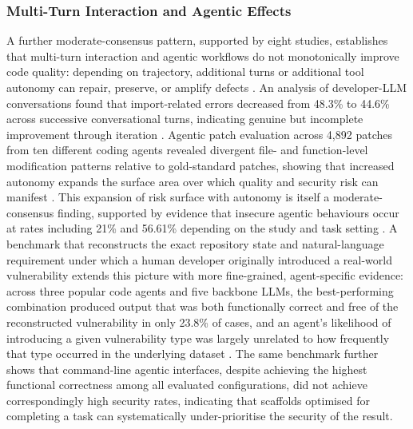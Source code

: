 \subsubsection{Multi-Turn Interaction and Agentic Effects}
\label{sec:cqtd-multiturn}
A further moderate-consensus pattern, supported by eight studies, establishes that multi-turn interaction and agentic workflows do not monotonically improve code quality: depending on trajectory, additional turns or additional tool autonomy can repair, preserve, or amplify defects \cite{chen_evaluating_2024,vangala_ai-generated_2026,kozak_when_2025,zhong_developer-llm_2025,sajadi_how_2025,abbassi_recatcher_2025,honarvar_turbulence_2025,aleithan_swe-bench_2024}. An analysis of developer-LLM conversations found that import-related errors decreased from 48.3\% to 44.6\% across successive conversational turns, indicating genuine but incomplete improvement through iteration \cite{zhong_developer-llm_2025}. Agentic patch evaluation across 4,892 patches from ten different coding agents revealed divergent file- and function-level modification patterns relative to gold-standard patches, showing that increased autonomy expands the surface area over which quality and security risk can manifest \cite{chen_evaluating_2024}. This expansion of risk surface with autonomy is itself a moderate-consensus finding, supported by evidence that insecure agentic behaviours occur at rates including 21\% and 56.61\% depending on the study and task setting \cite{kozak_when_2025}. A benchmark that reconstructs the exact repository state and natural-language requirement under which a human developer originally introduced a real-world vulnerability extends this picture with more fine-grained, agent-specific evidence: across three popular code agents and five backbone LLMs, the best-performing combination produced output that was both functionally correct and free of the reconstructed vulnerability in only 23.8\% of cases, and an agent's likelihood of introducing a given vulnerability type was largely unrelated to how frequently that type occurred in the underlying dataset \cite{chen_securevibebench_2026}. The same benchmark further shows that command-line agentic interfaces, despite achieving the highest functional correctness among all evaluated configurations, did not achieve correspondingly high security rates, indicating that scaffolds optimised for completing a task can systematically under-prioritise the security of the result.

